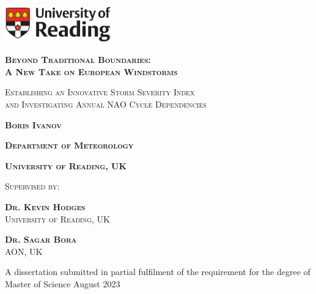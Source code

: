\begin{titlepage}
\singlespacing
    \hfill \includegraphics[width=0.35\textwidth]{figures/rdglogo.png}
    \vspace{45mm}

    \begin{center}
        \color{Maroon}
        \huge \textsc{\textbf{Beyond Traditional Boundaries: \\ A New Take on European Windstorms}} %
        \vspace{3mm}

        \color{Black}
        \Large \textsc{Establishing an Innovative Storm Severity Index \\and Investigating Annual NAO Cycle Dependencies} %
        \vspace{14mm}

        \large \textsc{\textbf{Boris Ivanov}} %
        \vspace{1mm}

        \color[HTML]{6C6C6C}
        \normalsize \textsc{\textbf{Department of Meteorology}} %
        \vspace{1mm}

        \normalsize \textsc{\textbf{University of Reading, UK}} %
        \vspace{10mm}

        \color{Black}
        \normalsize \textsc{Supervised by:} %
        \vspace{3mm}

        \begin{minipage}{0.4\textwidth}
            \begin{center}
                \normalsize \textsc{\textbf{Dr. Kevin Hodges}} \\ %
                \color[HTML]{6C6C6C}
                \normalsize \textsc{University of Reading, UK} %
            \end{center}
        \end{minipage}
        \begin{minipage}{0.4\textwidth}
            \begin{center}
                \normalsize \textsc{\textbf{Dr. Sagar Bora}} \\ %
                \color[HTML]{6C6C6C}
                \normalsize \textsc{AON, UK} %
            \end{center}
        \end{minipage}

        \vfill
        \color{Black}
        \small %
            A dissertation submitted in partial fulfilment of the requirement for the degree of Master of Science
        \normalsize %
        August 2023 
    \end{center}
\doublespacing
\end{titlepage}
